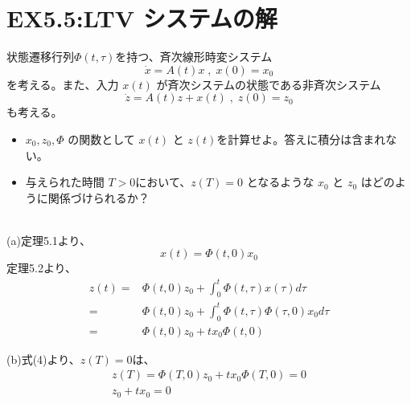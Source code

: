 \documentclass{jsarticle}
\begin{document}

\section*{EX5.5:LTV システムの解} 

状態遷移行列$\Phi(t,\tau)$を持つ、斉次線形時変システム
\begin{equation}
  \dot{x} =A(t)x\;,\;x(0) = x_0
\end{equation}
を考える。また、入力 $x ( t )$ が斉次システムの状態である非斉次システム
\begin{equation}
  \dot{z} = A(t)z + x(t) \;,\; z(0) = z_0
\end{equation}
も考える。
\begin{itemize}
  \item[(a)] $x_0 , z_0,\Phi$ の関数として $x ( t )$ と $z ( t ) $を計算せよ。答えに積分は含まれない。
  \item[(b)] 与えられた時間 $T > 0 $において、$z ( T ) = 0$ となるような $x_0$ と $z_0$ はどのように関係づけられるか？
\end{itemize}
\;\\
(a)\;\;定理5.1より、
\begin{equation}
  x(t) = \Phi(t,0)x_0
\end{equation}
定理5.2より、
\begin{equation}
  \begin{aligned}
    z(t) = &\Phi(t,0)z_0 + \int^t_0\Phi(t,\tau)x(\tau)d\tau\\
     = & \Phi(t,0)z_0 + \int^t_0\Phi(t,\tau)\Phi(\tau,0)x_0 d\tau\\
     = &  \Phi(t,0)z_0 + tx_0\Phi(t,0)
  \end{aligned} 
\end{equation}

(b)\;\;式(4)より、$z ( T ) = 0$は、
\begin{equation}
  \begin{aligned}
    z(T) = \Phi(T,0)z_0 + tx_0\Phi(T,0) = 0\\
    z_0 + tx_0 = 0
  \end{aligned}
\end{equation}
\end{document}
